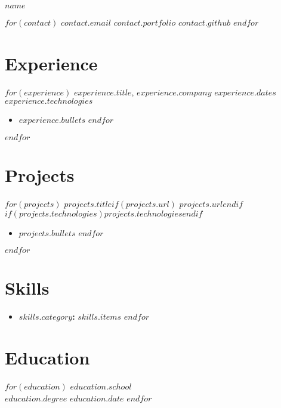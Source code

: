 \documentclass[11pt]{article}
\newcommand{\entrytitle}[1]{\vspace{0.5em}\textbf{#1}}
\begin{document}
\centerline{\Huge{$name$}}

\centerline{$for(contact)$
  $contact.email$ \textbar{} $contact.portfolio$ \textbar{} $contact.github$
$endfor$}

\section{Experience}
$for(experience)$
\entrytitle{$experience.title$}, $experience.company$ \hfill $experience.dates$ \\
\textit{$experience.technologies$}
\begin{itemize}
$for(experience.bullets)$
    \item $experience.bullets$
$endfor$
\end{itemize}
$endfor$

\section{Projects}
$for(projects)$
\entrytitle{$projects.title$}$if(projects.url)$ \hfill $projects.url$$endif$ \\
$if(projects.technologies)$\textit{$projects.technologies$}$endif$
\begin{itemize}
$for(projects.bullets)$
    \item $projects.bullets$
$endfor$
\end{itemize}
$endfor$

\section{Skills}
\begin{itemize}[label={},leftmargin=0em]
$for(skills)$
    \item \textbf{$skills.category$:} $skills.items$
$endfor$
\end{itemize}

\section{Education}
$for(education)$
\textbf{$education.school$} \\
$education.degree$ \hfill $education.date$
$endfor$
\end{document}
